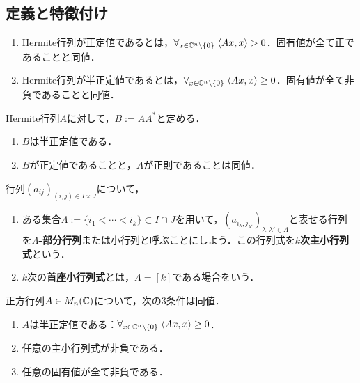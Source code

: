 \documentclass[uplatex, dvipdfmx]{jsreport}
\begin{document}
\subsection{定義と特徴付け}

\begin{definition}\mbox{}
    \begin{enumerate}
        \item Hermite行列が正定値であるとは，$\forall_{x\in\mathbb{C}^n\setminus\{0\}}\;\langle Ax,x\rangle>0$．固有値が全て正であることと同値．
        \item Hermite行列が半正定値であるとは，$\forall_{x\in\mathbb{C}^n\setminus\{0\}}\;\langle Ax,x\rangle\ge 0$．固有値が全て非負であることと同値．
    \end{enumerate}
\end{definition}

\begin{lemma}
    Hermite行列$A$に対して，$B:=AA^*$と定める．
    \begin{enumerate}
        \item $B$は半正定値である．
        \item $B$が正定値であることと，$A$が正則であることは同値．
    \end{enumerate}
\end{lemma}

\begin{definition}
    行列$(a_{ij})_{(i,j)\in I\times J}$について，
    \begin{enumerate}
        \item ある集合$\Lambda:=\{i_1<\cdots<i_k\}\subset I\cap J$を用いて，$(a_{i_\lambda,j_{\lambda'}})_{\lambda,\lambda'\in\Lambda}$と表せる行列を\textbf{$\Lambda$-部分行列}または小行列と呼ぶことにしよう．この行列式を\textbf{$k$次主小行列式}という．
        \item $k$次の\textbf{首座小行列式}とは，$\Lambda=[k]$である場合をいう．
    \end{enumerate}
\end{definition}

\begin{lemma}[半正定値性の特徴付け]
    正方行列$A\in M_n(\mathbb{C})$について，次の3条件は同値．
    \begin{enumerate}
        \item $A$は半正定値である：$\forall_{x\in\mathbb{C}^n\setminus\{0\}}\;\langle Ax,x\rangle\ge 0$．
        \item 任意の主小行列式が非負である．
        \item 任意の固有値が全て非負である．
    \end{enumerate}
\end{lemma}
\end{document}
